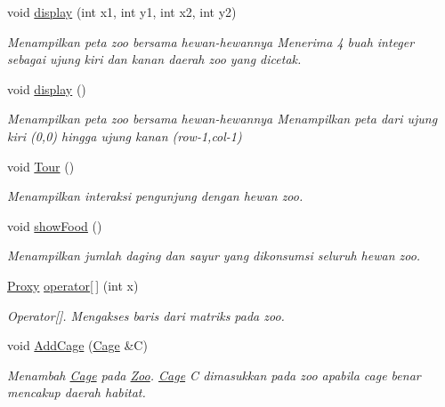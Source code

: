 \begin{DoxyCompactItemize}
void \hyperlink{classZoo_a44f15c303d1457b3295b8ff77063cb71}{display} (int x1, int y1, int x2, int y2)
\begin{DoxyCompactList}\small\item\em Menampilkan peta zoo bersama hewan-\/hewannya Menerima 4 buah integer sebagai ujung kiri dan kanan daerah zoo yang dicetak. \end{DoxyCompactList}\item 
void \hyperlink{classZoo_a2cd2351087a82804dccefc72fc711a74}{display} ()
\begin{DoxyCompactList}\small\item\em Menampilkan peta zoo bersama hewan-\/hewannya Menampilkan peta dari ujung kiri (0,0) hingga ujung kanan (row-\/1,col-\/1) \end{DoxyCompactList}\item 
void \hyperlink{classZoo_a49fcd39d8c5b581c53207cc53db60aab}{Tour} ()
\begin{DoxyCompactList}\small\item\em Menampilkan interaksi pengunjung dengan hewan zoo. \end{DoxyCompactList}\item 
void \hyperlink{classZoo_adac2ff0ed102c46fb200f0432548a168}{show\+Food} ()
\begin{DoxyCompactList}\small\item\em Menampilkan jumlah daging dan sayur yang dikonsumsi seluruh hewan zoo. \end{DoxyCompactList}\item 
\hyperlink{classZoo_1_1Proxy}{Proxy} \hyperlink{classZoo_a7a4481f896713854f21bf4cfe745142e}{operator\mbox{[}$\,$\mbox{]}} (int x)
\begin{DoxyCompactList}\small\item\em Operator\mbox{[}\mbox{]}. Mengakses baris dari matriks pada zoo. \end{DoxyCompactList}\item 
void \hyperlink{classZoo_a0f792b8221f13dcf6d1ec4a0f0ece353}{Add\+Cage} (\hyperlink{classCage}{Cage} \&C)
\begin{DoxyCompactList}\small\item\em Menambah \hyperlink{classCage}{Cage} pada \hyperlink{classZoo}{Zoo}. \hyperlink{classCage}{Cage} C dimasukkan pada zoo apabila cage benar mencakup daerah habitat. \end{DoxyCompactList}\end{DoxyCompactItemize}
